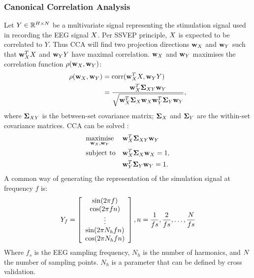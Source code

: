\subsubsection{Canonical Correlation Analysis}
\label{subsubsec:cca}
Let  $Y \in \mathbb{R}^{H \times N}$ be a multivariate signal representing the stimulation signal used in recording the EEG signal $X$.
Per SSVEP principle, $X$ is expected to be correlated to $Y$. 
Thus CCA will find two projection directions $\mathbf{w}_{X}$ and $\mathbf{w}_Y$ such that $\mathbf{w}_X^T X$ and $\mathbf{w}_Y Y$ have maximal correlation.
$\mathbf{w}_{X}$ and $\mathbf{w}_Y$ maximises the correlation function $\rho(\mathbf{w}_{X},\mathbf{w}_Y)$:
\begin{equation}
\label{eq:cca-rho}
  \begin{split}
    \rho(\w_X,\w_Y) & = \mathrm{corr}(\w_X^T \X,\w_Y Y)
		\\
    & = \frac{\w_{\X}^T \Scat_{\X Y} \w_Y}{\sqrt{\w_{\X}^T \Scat_{\X} \w_X  \w_Y^T \Scat_{Y} \w_Y}},
  \end{split}  
\end{equation}
where $\mathbf{\Sigma}_{X Y}$ is the between-set covariance matrix; $\mathbf{\Sigma}_{X}$ and $\mathbf{\Sigma}_{Y}$ are the within-set covariance matrices.
CCA can be solved \citep[as in][]{hardoon_canonical_2004}:
\begin{equation*}
\begin{aligned}
& \underset{\mathbf{w}_X, \mathbf{w}_Y}{\text{maximise}}
& & \mathbf{w}_{X}^T \mathbf{\Sigma}_{X Y} \mathbf{w}_Y \\
& \text{subject to}
& & \mathbf{w}_{X}^T \mathbf{\Sigma}_{X} \mathbf{w}_X = 1, \\
&&& \mathbf{w}_Y^T \mathbf{\Sigma}_{Y} \mathbf{w}_Y = 1.
\end{aligned}
\end{equation*}
A common way of generating the representation of the simulation signal at frequency $f$ is:
\begin{equation} \label{eq:ref-sig}
    Y_f=\left[
    \begin{array}{c}
    \sin(2\pi f) \\ \cos(2\pi f n) \\
    \vdots \\ \sin(2\pi N_h f n) \\ \cos(2\pi N_h f n)
    \end{array}
    \right],n = \frac{1}{fs}, \frac{2}{fs}, \dots, \frac{\dt}{fs}
\end{equation}  
Where $f_s$ is the EEG sampling frequency, $N_h$ is the number of harmonics, and  $N$ the number of sampling points.
$N_h$ is a parameter that can be defined by cross validation.

